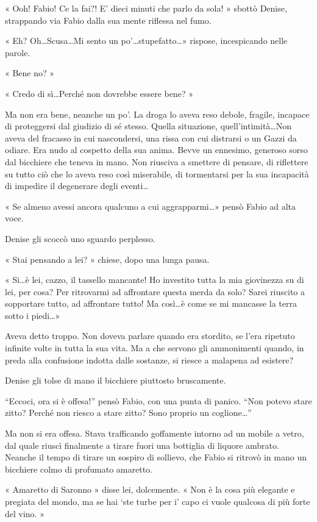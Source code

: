 « Ooh! Fabio! Ce la fai?! E' dieci minuti che parlo da sola! » sbottò Denise, strappando via Fabio dalla sua mente riflessa nel fumo.

« Eh? Oh\ldots Scusa\ldots Mi sento un po'\ldots stupefatto\ldots » rispose, incespicando nelle parole.

« Bene no? »

« Credo di sì\ldots Perché non dovrebbe essere bene? »

Ma non era bene, neanche un po'. La droga lo aveva reso debole, fragile, incapace di proteggersi dal giudizio di sé stesso. Quella situazione, quell'intimità\ldots Non aveva del fracasso in cui nascondersi, una rissa con cui distrarsi o un Gazzi da odiare. Era nudo al cospetto della sua anima. Bevve un ennesimo, generoso sorso dal bicchiere che teneva in mano. Non riusciva a smettere di pensare, di riflettere su tutto ciò che lo aveva reso così miserabile, di tormentarsi per la sua incapacità di impedire il degenerare degli eventi\ldots

« Se almeno avessi ancora qualcuno a cui aggrapparmi\ldots » pensò Fabio ad alta voce.

Denise gli scoccò uno sguardo perplesso.

« Stai pensando a lei? » chiese, dopo una lunga pausa.

« Si\ldots è lei, cazzo, il tassello mancante! Ho investito tutta la mia giovinezza su di lei, per cosa? Per ritrovarmi ad affrontare questa merda da solo? Sarei riuscito a sopportare tutto, ad affrontare tutto! Ma così\ldots è come se mi mancasse la terra sotto i piedi\ldots »

Aveva detto troppo. Non doveva parlare quando era stordito, se l'era ripetuto infinite volte in tutta la sua vita. Ma a che servono gli ammonimenti quando, in preda alla confusione indotta dalle sostanze, si riesce a malapena ad esistere?

Denise gli tolse di mano il bicchiere piuttosto bruscamente.

``Eccoci, ora si è offesa!'' pensò Fabio, con una punta di panico. ``Non potevo stare zitto? Perché non riesco a stare zitto? Sono proprio un coglione\ldots''

Ma non si era offesa. Stava trafficando goffamente intorno ad un mobile a vetro, dal quale riuscì finalmente a tirare fuori una bottiglia di liquore ambrato. Neanche il tempo di tirare un sospiro di sollievo, che Fabio si ritrovò in mano un bicchiere colmo di profumato amaretto.

« Amaretto di Saronno » disse lei, dolcemente. « Non è la cosa più elegante e pregiata del mondo, ma se hai `ste turbe per i' capo ci vuole qualcosa di più forte del vino. »

